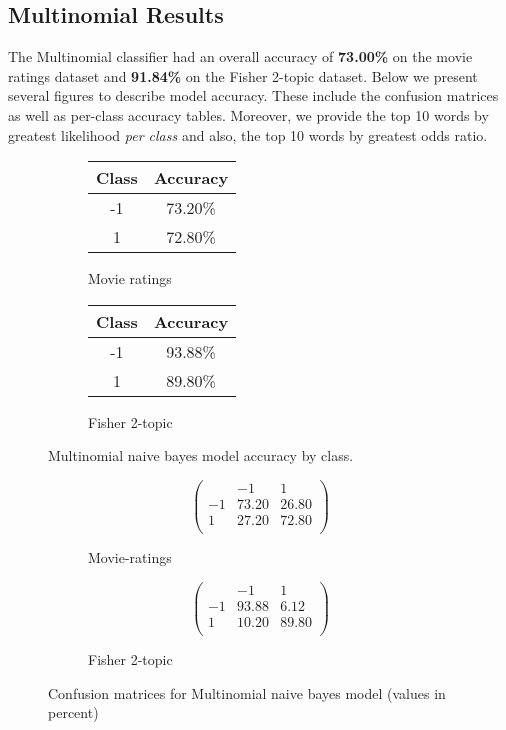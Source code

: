 \documentclass[10pt,a4paper]{article}
\begin{document}
\subsection{Multinomial Results}
The Multinomial classifier had an overall accuracy of \textbf{73.00\%} on the movie ratings dataset and \textbf{91.84\%} on the Fisher 2-topic dataset. Below we present several figures to describe model accuracy. These include the confusion matrices as well as per-class accuracy tables. Moreover, we provide the top 10 words by greatest likelihood \emph{per class} and also, the top 10 words by greatest odds ratio.

\begin{figure}[H]
\centering
\begin{subfigure}{0.3\textwidth}
\begin{tabular}{|c|c|}
\hline
Class & Accuracy \\
\hline
-1 & 73.20\% \\
1 & 72.80\% \\
\hline
\end{tabular}
\caption{Movie ratings}
\end{subfigure}%
\begin{subfigure}{0.3\textwidth}
\begin{tabular}{|c|c|}
\hline
Class & Accuracy \\
\hline
-1 & 93.88\% \\
1 & 89.80\% \\
\hline
\end{tabular}
\caption{Fisher 2-topic}
\end{subfigure}
\caption{Multinomial naive bayes model accuracy by class.}
\end{figure}

\begin{figure}[H]
\begin{subfigure}{0.5\textwidth}
\[
\left(
\begin{array}{c|cc}
 & -1 & 1 \\
\hline
-1 & 73.20 & 26.80 \\
1 & 27.20 & 72.80 \\
\end{array}
\right)
\]
\caption{Movie-ratings}
\end{subfigure}
\begin{subfigure}{0.5\textwidth}
\[
\left(
\begin{array}{c|cc}
 & -1 & 1 \\
\hline
-1 & 93.88 & 6.12 \\
1 & 10.20 & 89.80 \\
\end{array}
\right)
\]
\caption{Fisher 2-topic}
\end{subfigure}
\caption{Confusion matrices for Multinomial naive bayes model (values in percent)}
\end{figure}
\end{document}
